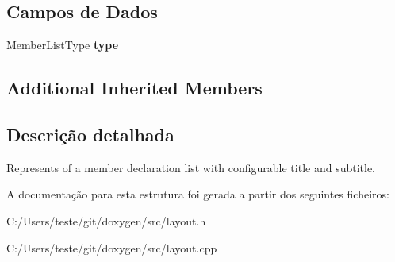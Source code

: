 \subsection*{Campos de Dados}
\begin{DoxyCompactItemize}
\item 
\hypertarget{struct_layout_doc_entry_member_decl_ac52a09d0822d464897136e74d416ac69}{Member\-List\-Type {\bfseries type}}\label{struct_layout_doc_entry_member_decl_ac52a09d0822d464897136e74d416ac69}

\end{DoxyCompactItemize}
\subsection*{Additional Inherited Members}


\subsection{Descrição detalhada}
Represents of a member declaration list with configurable title and subtitle. 

A documentação para esta estrutura foi gerada a partir dos seguintes ficheiros\-:\begin{DoxyCompactItemize}
\item 
C\-:/\-Users/teste/git/doxygen/src/layout.\-h\item 
C\-:/\-Users/teste/git/doxygen/src/layout.\-cpp\end{DoxyCompactItemize}
